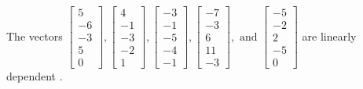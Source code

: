 \begin{exercise}
\begin{exerciseStatement}
  \end{exerciseStatement}
  \begin{exerciseAnswer}
   The vectors \(\left[\begin{array}{r}
5 \\
-6 \\
-3 \\
5 \\
0
\end{array}\right] , \left[\begin{array}{r}
4 \\
-1 \\
-3 \\
-2 \\
1
\end{array}\right] , \left[\begin{array}{r}
-3 \\
-1 \\
-5 \\
-4 \\
-1
\end{array}\right] , \left[\begin{array}{r}
-7 \\
-3 \\
6 \\
11 \\
-3
\end{array}\right] , \text{ and } \left[\begin{array}{r}
-5 \\
-2 \\
2 \\
-5 \\
0
\end{array}\right]\) are 
  	 linearly dependent  .
  


  \end{exerciseAnswer}
\end{exercise}